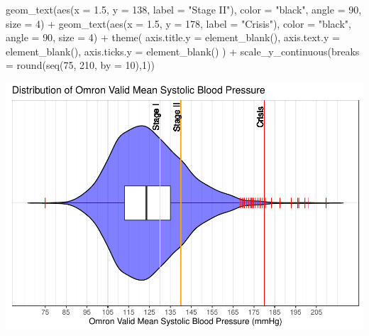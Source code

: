 \documentclass[
  11pt,
]{article}
\newenvironment{Shaded}{\begin{snugshade}}{\end{snugshade}}
\newcommand{\AttributeTok}[1]{\textcolor[rgb]{0.77,0.63,0.00}{#1}}
\newcommand{\DecValTok}[1]{\textcolor[rgb]{0.00,0.00,0.81}{#1}}
\newcommand{\FloatTok}[1]{\textcolor[rgb]{0.00,0.00,0.81}{#1}}
\newcommand{\FunctionTok}[1]{\textcolor[rgb]{0.00,0.00,0.00}{#1}}
\newcommand{\NormalTok}[1]{#1}
\newcommand{\SpecialCharTok}[1]{\textcolor[rgb]{0.00,0.00,0.00}{#1}}
\newcommand{\StringTok}[1]{\textcolor[rgb]{0.31,0.60,0.02}{#1}}
\begin{document}
\begin{Shaded}
\begin{Highlighting}[]
  \FunctionTok{geom\_text}\NormalTok{(}\FunctionTok{aes}\NormalTok{(}\AttributeTok{x =} \FloatTok{1.5}\NormalTok{, }\AttributeTok{y =} \DecValTok{138}\NormalTok{, }\AttributeTok{label =} \StringTok{"Stage II"}\NormalTok{), }\AttributeTok{color =} \StringTok{"black"}\NormalTok{, }\AttributeTok{angle =} \DecValTok{90}\NormalTok{, }\AttributeTok{size =} \DecValTok{4}\NormalTok{) }\SpecialCharTok{+}
  \FunctionTok{geom\_text}\NormalTok{(}\FunctionTok{aes}\NormalTok{(}\AttributeTok{x =} \FloatTok{1.5}\NormalTok{, }\AttributeTok{y =} \DecValTok{178}\NormalTok{, }\AttributeTok{label =} \StringTok{"Crisis"}\NormalTok{), }\AttributeTok{color =} \StringTok{"black"}\NormalTok{, }\AttributeTok{angle =} \DecValTok{90}\NormalTok{, }\AttributeTok{size =} \DecValTok{4}\NormalTok{) }\SpecialCharTok{+}
  \FunctionTok{theme}\NormalTok{(}
    \AttributeTok{axis.title.y =} \FunctionTok{element\_blank}\NormalTok{(),}
    \AttributeTok{axis.text.y =} \FunctionTok{element\_blank}\NormalTok{(),}
    \AttributeTok{axis.ticks.y =} \FunctionTok{element\_blank}\NormalTok{()}
\NormalTok{  ) }\SpecialCharTok{+}
  \FunctionTok{scale\_y\_continuous}\NormalTok{(}\AttributeTok{breaks =} \FunctionTok{round}\NormalTok{(}\FunctionTok{seq}\NormalTok{(}\DecValTok{75}\NormalTok{, }\DecValTok{210}\NormalTok{, }\AttributeTok{by =} \DecValTok{10}\NormalTok{),}\DecValTok{1}\NormalTok{))}
\end{Highlighting}
\end{Shaded}

\includegraphics{figs/Outliers.pdf}
\end{document}
